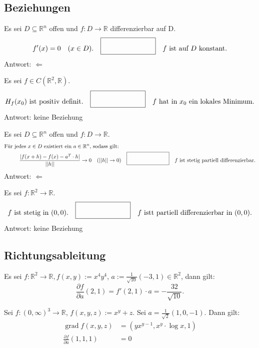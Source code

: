 \documentclass[parskip=full]{scrartcl}
\DeclareMathOperator{\grad}{grad}
\begin{document}
\subsection{Beziehungen}
Es sei $D \subseteq \mathbb{R}^n$ offen und $f : D \to \mathbb{R}$ differenzierbar auf D.
\begin{displaymath}
  f'(x) = 0 \quad (x \in D). \quad \fbox{\rule{1in}{0pt}\rule[-0.5ex]{0pt}{4ex}} \quad f \text{ ist auf } D \text{ konstant}.
\end{displaymath}
Antwort: $\Leftarrow$

Es sei $f \in C(\mathbb{R}^2, \mathbb{R})$.
\begin{displaymath}
  H_f(x_0) \text{ ist positiv definit.} \quad \fbox{\rule{1in}{0pt}\rule[-0.5ex]{0pt}{4ex}} \quad f \text{ hat in } x_0 \text{ ein lokales Minimum.}
\end{displaymath}
Antwort: keine Beziehung

Es sei $D \subseteq \mathbb{R}^n$ offen und $f : D \to \mathbb{R}$.
\begin{align*}
  \text{Für jedes } x \in D \text{ existiert ein } a \in \mathbb{R}^n \text{, sodass gilt: }&\\
  \frac{|f(x + h) - f(x) - a^T \cdot h|}{||h||} \to 0 \quad (||h|| \to 0)& \quad \fbox{\rule{1in}{0pt}\rule[-0.5ex]{0pt}{4ex}} \quad f \text{ ist stetig partiell differenzierbar.}
\end{align*}
Antwort: $\Leftarrow$

Es sei $f : \mathbb{R}^2 \to \mathbb{R}$.
\begin{displaymath}
  f \text{ ist stetig in } (0,0).
  \quad \fbox{\rule{1in}{0pt}\rule[-0.5ex]{0pt}{4ex}} \quad
  f \text{ istt partiell differenzierbar in } (0,0).
\end{displaymath}
Antwort: keine Beziehung

\subsection{Richtungsableitung}
Es sei $f : \mathbb{R}^2 \to \mathbb{R}, f(x,y) := x^4 y^4$, $a := \frac{1}{\sqrt{10}}(-3,1) \in \mathbb{R}^2$, dann gilt:
\begin{displaymath}
  \frac{\partial f}{\partial a} \left(2,1\right) = f'(2,1) \cdot a = -\frac{32}{\sqrt{10}}.
\end{displaymath}

Sei $f : (0,\infty)^3 \to \mathbb{R}$, $f(x,y,z) := x^y + z$.
Sei $a = \frac{1}{\sqrt{2}}(1, 0, -1)$.
Dann gilt:
\begin{align*}
  \grad f(x,y,z) &= (yx^{y - 1}, x^y \cdot \log x, 1)\\
  \frac{\partial f}{\partial a} (1,1,1) &= 0
\end{align*}
\end{document}
